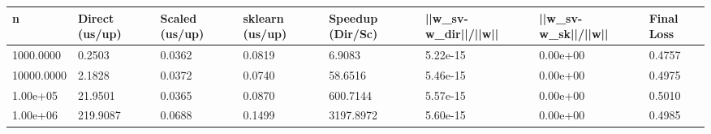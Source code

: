 \begin{table}[htbp]
\centering
\begin{tabular}{llllllll}
\toprule
n & Direct (us/up) & Scaled (us/up) & sklearn (us/up) & Speedup (Dir/Sc) & ||w\_sv-w\_dir||/||w|| & ||w\_sv-w\_sk||/||w|| & Final Loss \\
\midrule
1000.0000 & 0.2503 & 0.0362 & 0.0819 & 6.9083 & 5.22e-15 & 0.00e+00 & 0.4757 \\
10000.0000 & 2.1828 & 0.0372 & 0.0740 & 58.6516 & 5.46e-15 & 0.00e+00 & 0.4975 \\
1.00e+05 & 21.9501 & 0.0365 & 0.0870 & 600.7144 & 5.57e-15 & 0.00e+00 & 0.5010 \\
1.00e+06 & 219.9087 & 0.0688 & 0.1499 & 3197.8972 & 5.60e-15 & 0.00e+00 & 0.4985 \\
\bottomrule
\end{tabular}
\end{table}
